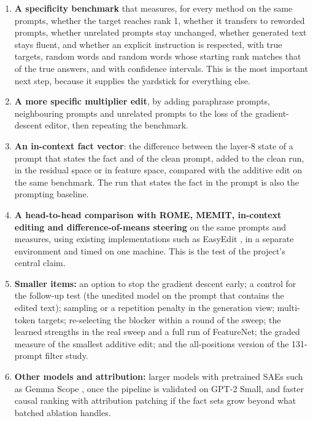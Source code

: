 \documentclass[12pt,a4paper]{report}
\begin{document}
\begin{enumerate}
  \item \textbf{A specificity benchmark} that measures, for every method on the same prompts, whether the target reaches rank 1, whether it transfers to reworded prompts, whether unrelated prompts stay unchanged, whether generated text stays fluent, and whether an explicit instruction is respected, with true targets, random words and random words whose starting rank matches that of the true answers, and with confidence intervals. This is the most important next step, because it supplies the yardstick for everything else.
  \item \textbf{A more specific multiplier edit}, by adding paraphrase prompts, neighbouring prompts and unrelated prompts to the loss of the gradient-descent editor, then repeating the benchmark.
  \item \textbf{An in-context fact vector}: the difference between the layer-8 state of a prompt that states the fact and of the clean prompt, added to the clean run, in the residual space or in feature space, compared with the additive edit on the same benchmark. The run that states the fact in the prompt is also the prompting baseline.
  \item \textbf{A head-to-head comparison with ROME, MEMIT, in-context editing and difference-of-means steering} on the same prompts and measures, using existing implementations such as EasyEdit \cite{r32}, in a separate environment and timed on one machine. This is the test of the project's central claim.
  \item \textbf{Smaller items:} an option to stop the gradient descent early; a control for the follow-up test (the unedited model on the prompt that contains the edited text); sampling or a repetition penalty in the generation view; multi-token targets; re-selecting the blocker within a round of the sweep; the learned strengths in the real sweep and a full run of FeatureNet; the graded measure of the smallest additive edit; and the all-positions version of the 131-prompt filter study.
  \item \textbf{Other models and attribution:} larger models with pretrained SAEs such as Gemma Scope \cite{r19}, once the pipeline is validated on GPT-2 Small, and faster causal ranking with attribution patching \cite{r16} if the fact sets grow beyond what batched ablation handles.
\end{enumerate}
\end{document}
